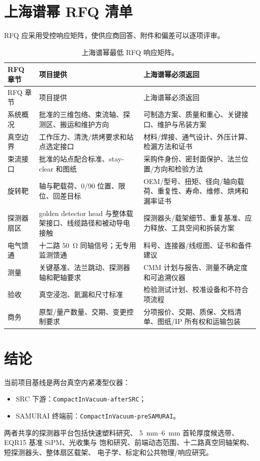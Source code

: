 \documentclass[UTF8,10pt,letterpaper,fontset=none]{ctexart}
\begin{document}
\section{上海谱幂 RFQ 清单}

RFQ 应采用受控响应矩阵，使供应商回答、附件和偏差可以逐项评审。

\begin{longtable}{L{0.19\textwidth}L{0.34\textwidth}L{0.38\textwidth}}
  \caption{上海谱幂最低 RFQ 响应矩阵。}\\
  \toprule
  RFQ 章节 & 项目提供 & 上海谱幂必须返回 \\
  \midrule
  \endfirsthead
  \toprule
  RFQ 章节 & 项目提供 & 上海谱幂必须返回 \\
  \midrule
  \endhead
  系统概况 & 批准的三维包络、束流轴、探测区、搬运和维护方向 &
    可制造方案、质量和重心、关键接口、维护与吊装方案 \\
  真空边界 & 工作压力、清洗/烘烤要求和站点选定接口 &
    材料/焊接、通气设计、外压计算、检漏方法和证书 \\
  束流接口 & 批准的站点配合标准、stay-clear 和图纸 &
    采购件身份、密封面保护、法兰位置/方向和检验方法 \\
  旋转靶 & 轴与靶载荷、0/90 位置、限位、回差目标 &
    OEM/型号、扭矩、径向/轴向载荷、重复性、寿命、维修、烘烤和漏率证书 \\
  探测器扇区 & golden detector head 与整体载架接口、线缆路径和被动导电接触 &
    探测器头/载架细节、重复基准、应力释放、工具空间和拆装方案 \\
  电气馈通 & 十二路 \SI{50}{\ohm} 同轴信号；无专用监测馈通 &
    料号、连接器/线缆图、证书和备件建议 \\
  测量 & 关键基准、法兰跳动、探测器轴和靶轴要求 &
    CMM 计划与报告、测量不确定度和可追溯仪器 \\
  验收 & 真空浸泡、氦漏和尺寸标准 &
    检验测试计划、校准设备和不符合项流程 \\
  商务 & 原型/量产数量、交期、变更控制要求 &
    分项报价、交期、质保、文档清单、图纸/IP 所有权和运输包装 \\
  \bottomrule
\end{longtable}

\section{结论}

当前项目基线是两台真空内紧凑型仪器：
\begin{itemize}
  \item SRC 下游：\texttt{CompactInVacuum-afterSRC}；
  \item SAMURAI 终端前：\texttt{CompactInVacuum-preSAMURAI}。
\end{itemize}
两者共享的探测器平台包括快速塑料研究、
\SIrange{5}{6}{\milli\meter} 首轮厚度候选带、EQR15 基准 SiPM、光收集与
饱和研究、前端动态范围、十二路真空同轴架构、短探测器头、整体扇区载架、
电子学、标定和公共物理/响应研究。
\end{document}
